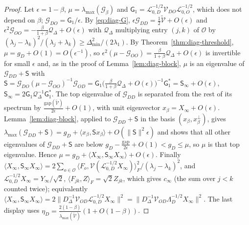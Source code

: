 \documentclass[11pt]{article}
\theoremstyle{remark}
\begin{document}
\begin{proof}
Let $\epsilon=1-\beta$, $\mu=\lambda_{\max}(\mathcal G_\beta)$ and $\mathsf G_1=\mathcal L_{0,D}^{-1/2}\mathcal V_{DO}\mathcal L_{0,O}^{-1/2}$, which does not depend on $\beta$; $\mathcal G_{DO}=\mathsf G_1/\epsilon$. By \eqref{eq:diag-G}, $\epsilon\mathcal G_{DD}=\frac12\widetilde{\mathcal V}+O(\epsilon)$ and $\epsilon^2\mathcal G_{OO}=-\frac{\beta}{1+\beta}\mathcal Q_\Delta+O(\epsilon)$ with $\mathcal Q_\Delta$ multiplying entry $(j,k)$ of $\mathcal O$ by $(\lambda_j-\lambda_k)^2/(\lambda_j+\lambda_k)\ge\Delta_{\min}^2/(2\lambda_1)$. By Theorem~\ref{thm:diag-threshold}, $\mu=g_D+O(1)=O(\epsilon^{-1})$, so $\epsilon^2(\mu-\mathcal G_{OO})=\frac{\beta}{1+\beta}\mathcal Q_\Delta+O(\epsilon)$ is invertible for small $\epsilon$ and, as in the proof of Lemma~\ref{lem:diag-block}, $\mu$ is an eigenvalue of $\mathcal G_{DD}+\mathsf S$ with $\mathsf S=\mathcal G_{DO}(\mu-\mathcal G_{OO})^{-1}\mathcal G_{OD}=\mathsf G_1\big(\tfrac{\beta}{1+\beta}\mathcal Q_\Delta+O(\epsilon)\big)^{-1}\mathsf G_1^*=\mathsf S_\infty+O(\epsilon)$, $\mathsf S_\infty=2\mathsf G_1\mathcal Q_\Delta^{-1}\mathsf G_1^*$. The top eigenvalue of $\mathcal G_{DD}$ is separated from the rest of its spectrum by $\frac{\mathrm{gap}(\widetilde{\mathcal V})}{2\epsilon}+O(1)$, with unit eigenvector $x_\beta=X_\infty+O(\epsilon)$. Lemma~\ref{lem:diag-block}, applied to $\mathcal G_{DD}+\mathsf S$ in the basis $(x_\beta,x_\beta^\perp)$, gives $\lambda_{\max}(\mathcal G_{DD}+\mathsf S)=g_D+\langle x_\beta,\mathsf Sx_\beta\rangle+O(\|\mathsf S\|^2\epsilon)$ and shows that all other eigenvalues of $\mathcal G_{DD}+\mathsf S$ are below $g_D-\frac{\mathrm{gap}}{2\epsilon}+O(1)<g_D\le\mu$, so $\mu$ is that top eigenvalue. Hence $\mu=g_D+\langle X_\infty,\mathsf S_\infty X_\infty\rangle+O(\epsilon)$. Finally $\langle X_\infty,\mathsf S_\infty X_\infty\rangle=2\sum_{o\in\mathcal O}\langle F_o,\mathcal V(\mathcal L_{0,D}^{-1/2}X_\infty)\rangle_F^2/(\lambda_j-\lambda_k)^2$, and $\mathcal L_{0,D}^{-1/2}X_\infty=Y_\infty/\sqrt2$, $\langle F_{jk},Z\rangle_F=\sqrt2Z_{jk}$, which gives $c_\infty$ (the sum over $j<k$ counted twice); equivalently $\langle X_\infty,\mathsf S_\infty X_\infty\rangle=2\|D_\Delta^{-1}\mathcal V_{OD}\mathcal L_{0,D}^{-1/2}X_\infty\|^2=\|D_\Delta^{-1}\mathcal V_{OD}\Lambda_D^{-1/2}X_\infty\|^2$. The last display uses $\eta_D=\frac{2(1-\beta)}{\lambda_{\max}(\widetilde{\mathcal V})}(1+O(1-\beta))$.
\end{proof}
\end{document}
